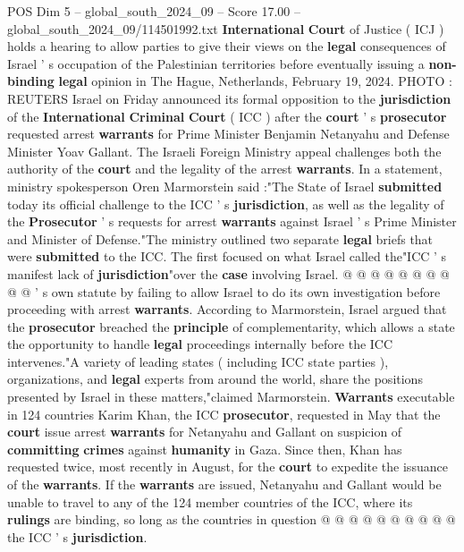 \begin{textsample}{POS Dim 5 – global\_south\_2024\_09 – Score 17.00 – global\_south\_2024\_09/114501992.txt}  \label{ex:f5_pos_251}
\textbf{International} \textbf{Court} of Justice ( ICJ ) holds a hearing to allow parties to give their views on the \textbf{legal} consequences of Israel ' s occupation of the Palestinian territories before eventually issuing a \textbf{non-binding} \textbf{legal} opinion in The Hague, Netherlands, February 19, 2024.
PHOTO : REUTERS Israel on Friday announced its formal opposition to the \textbf{jurisdiction} of the \textbf{International} \textbf{Criminal} \textbf{Court} ( ICC ) after the \textbf{court} ' s \textbf{prosecutor} requested arrest \textbf{warrants} for Prime Minister Benjamin Netanyahu and Defense Minister Yoav Gallant.
The Israeli Foreign Ministry appeal challenges both the authority of the \textbf{court} and the legality of the arrest \textbf{warrants}.
In a statement, ministry spokesperson Oren Marmorstein said :"The State of Israel \textbf{submitted} today its official challenge to the ICC ' s \textbf{jurisdiction}, as well as the legality of the \textbf{Prosecutor} ' s requests for arrest \textbf{warrants} against Israel ' s Prime Minister and Minister of Defense."The ministry outlined two separate \textbf{legal} briefs that were \textbf{submitted} to the ICC.
The first focused on what Israel called the"ICC ' s manifest lack of \textbf{jurisdiction}"over the \textbf{case} involving Israel. @ @ @ @ @ @ @ @ @ @ ' s own statute by failing to allow Israel to do its own investigation before proceeding with arrest \textbf{warrants}.
According to Marmorstein, Israel argued that the \textbf{prosecutor} breached the \textbf{principle} of complementarity, which allows a state the opportunity to handle \textbf{legal} proceedings internally before the ICC intervenes."A variety of leading states ( including ICC state parties ), organizations, and \textbf{legal} experts from around the world, share the positions presented by Israel in these matters,"claimed Marmorstein. \textbf{Warrants} executable in 124 countries Karim Khan, the ICC \textbf{prosecutor}, requested in May that the \textbf{court} issue arrest \textbf{warrants} for Netanyahu and Gallant on suspicion of \textbf{committing} \textbf{crimes} against \textbf{humanity} in Gaza.
Since then, Khan has requested twice, most recently in August, for the \textbf{court} to expedite the issuance of the \textbf{warrants}.
If the \textbf{warrants} are issued, Netanyahu and Gallant would be unable to travel to any of the 124 member countries of the ICC, where its \textbf{rulings} are binding, so long as the countries in question @ @ @ @ @ @ @ @ @ @ the ICC ' s \textbf{jurisdiction}.

\end{textsample}
